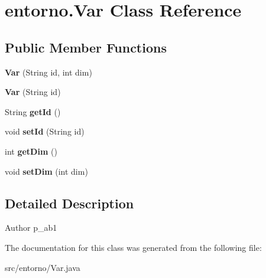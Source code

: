 \hypertarget{classentorno_1_1_var}{}\section{entorno.\+Var Class Reference}
\label{classentorno_1_1_var}
\subsection*{Public Member Functions}
\begin{DoxyCompactItemize}
\item 
\mbox{\label{classentorno_1_1_var_ae4d7c1cc982ac4e2477bdaba7b845f47}} 
{\bfseries Var} (String id, int dim)
\item 
\mbox{\label{classentorno_1_1_var_a8d8494803f31d391b81ea9abe98f7189}} 
{\bfseries Var} (String id)
\item 
\mbox{\label{classentorno_1_1_var_a429b876b41d8a7fbb63fddb683022f24}} 
String {\bfseries get\+Id} ()
\item 
\mbox{\label{classentorno_1_1_var_ae720e983a433df23c17790caab117988}} 
void {\bfseries set\+Id} (String id)
\item 
\mbox{\label{classentorno_1_1_var_aa5d4e0d1740ed68f216594ea7380817b}} 
int {\bfseries get\+Dim} ()
\item 
\mbox{\label{classentorno_1_1_var_a975e7bb6df68b94aacd29986b88cd507}} 
void {\bfseries set\+Dim} (int dim)
\end{DoxyCompactItemize}


\subsection{Detailed Description}
\begin{DoxyAuthor}{Author}
p\+\_\+ab1 
\end{DoxyAuthor}


The documentation for this class was generated from the following file\+:\begin{DoxyCompactItemize}
\item 
src/entorno/Var.\+java\end{DoxyCompactItemize}
